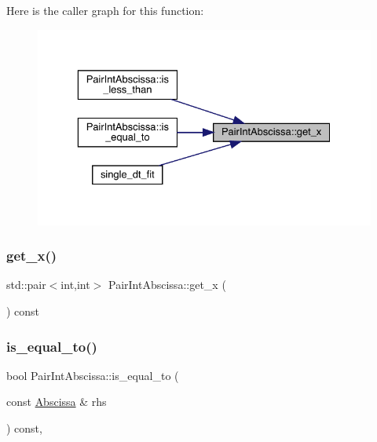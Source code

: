 Here is the caller graph for this function\+:
\nopagebreak
\begin{figure}[H]
\begin{center}
\leavevmode
\includegraphics[width=329pt]{dc/d86/classPairIntAbscissa_ae07a07c11afd74fd1a2e4c5ca9178229_icgraph}
\end{center}
\end{figure}
\mbox{\label{classPairIntAbscissa_ae07a07c11afd74fd1a2e4c5ca9178229}} 
\subsubsection{\texorpdfstring{get\_x()}{get\_x()}\hspace{0.1cm}{\footnotesize\ttfamily [2/2]}}
{\footnotesize\ttfamily std\+::pair$<$int,int$>$ Pair\+Int\+Abscissa\+::get\+\_\+x (\begin{DoxyParamCaption}{ }\end{DoxyParamCaption}) const\hspace{0.3cm}{\ttfamily [inline]}}

\mbox{\label{classPairIntAbscissa_a9f4bf45aafd0efa0a47fa6e8b77e25fa}} 
\subsubsection{\texorpdfstring{is\_equal\_to()}{is\_equal\_to()}\hspace{0.1cm}{\footnotesize\ttfamily [1/2]}}
{\footnotesize\ttfamily bool Pair\+Int\+Abscissa\+::is\+\_\+equal\+\_\+to (\begin{DoxyParamCaption}\item[{const \mbox{\hyperlink{classAbscissa}{Abscissa}} \&}]{rhs }\end{DoxyParamCaption}) const\hspace{0.3cm}{\ttfamily [inline]}, {\ttfamily [virtual]}}



